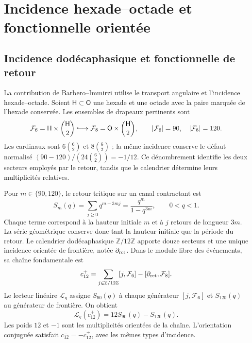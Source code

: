 \section{Incidence hexade–octade et fonctionnelle orientée}
\subsection{Incidence dodécaphasique et fonctionnelle de retour}

La contribution de Barbero--Immirzi utilise le transport angulaire et
l’incidence hexade--octade. Soient $\mathsf H\subset\mathsf O$ une hexade
et une octade avec la paire marquée de l’hexade conservée. Les ensembles de
drapeaux pertinents sont
\begin{equation}
 \mathcal F_6=\mathsf H\times\binom{\mathsf H}{2}
 \lhook\joinrel\longrightarrow
 \mathcal F_8=\mathsf O\times\binom{\mathsf H}{2},
 \qquad |\mathcal F_6|=90,\quad |\mathcal F_8|=120.
 \label{iii:eq:barbero-flags}
\end{equation}
Les cardinaux sont $6\binom62$ et $8\binom62$ ; la même incidence
conserve le défaut normalisé
$(90-120)/(24\binom62)=-1/12$. Ce dénombrement identifie les deux secteurs
employés par le retour, tandis que le calendrier détermine leurs
multiplicités relatives.

Pour $m\in\{90,120\}$, le retour tritique sur un canal contractant est
\begin{equation}
 S_m(q)=\sum_{j\geq0}q^{m+3mj}
       =\frac{q^m}{1-q^{3m}},\qquad 0<q<1.
 \label{iii:eq:barbero-return-series}
\end{equation}
Chaque terme correspond à la hauteur initiale $m$ et à $j$ retours de
longueur $3m$. La série géométrique conserve donc tant la hauteur
initiale que la période du retour. Le calendrier dodécaphasique
$\mathbb Z/12\mathbb Z$ apporte douze secteurs et une unique incidence
orientée de frontière, notée $\partial_{\rm ret}$. Dans le module
libre des événements, sa chaîne fondamentale est
\begin{equation}
 c_{12}^{+}
 =\sum_{j\in\mathbb Z/12\mathbb Z}[j,\mathcal F_6]
  -[\partial_{\rm ret},\mathcal F_8].
 \label{iii:eq:barbero-cycle}
\end{equation}
Le lecteur linéaire $\mathscr L_q$ assigne $S_{90}(q)$ à chaque générateur
$[j,\mathcal F_6]$ et $S_{120}(q)$ au générateur de frontière. On obtient
\begin{equation}
 \mathscr L_q(c_{12}^{+})=12S_{90}(q)-S_{120}(q).
 \label{iii:eq:barbero-weights}
\end{equation}
Les poids $12$ et $-1$ sont les multiplicités orientées de la chaîne.
L’orientation conjuguée satisfait $c_{12}^{-}=-c_{12}^{+}$, avec les
mêmes types d’incidence.

